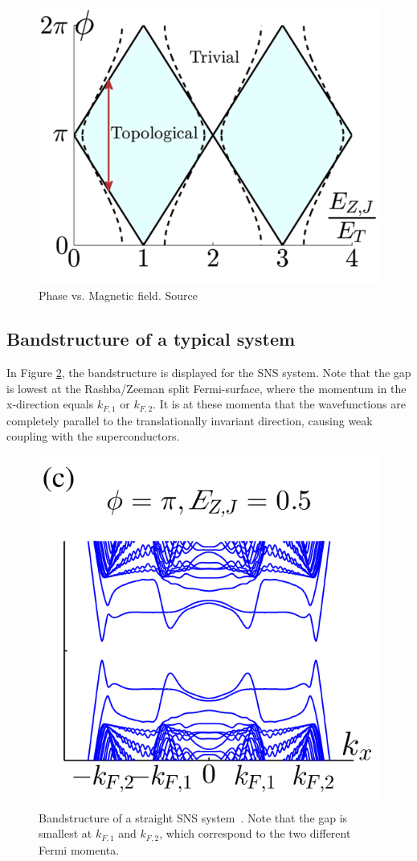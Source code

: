         \begin{figure}[!htb]
        \centering
        \includegraphics[width=0.5\columnwidth]{figures/pientka_phase_diagram}
        \caption{Phase vs. Magnetic field. Source\cite{pientka_topological_2017}}
        \label{fig:pientka_phase_diagram}
        \end{figure}
            
    \subsection{Bandstructure of a typical system}
        In Figure \ref{fig:pientka_bandstructure}, the bandstructure is displayed for the SNS system.
        Note that the gap is lowest at the Rashba/Zeeman split Fermi-surface, where the momentum in the x-direction equals $k_{F,1}$ or $k_{F,2}$.
        It is at these momenta that the wavefunctions are completely parallel to the translationally invariant direction, causing weak coupling with the superconductors.

        \begin{figure}[!htb]
        \centering
        \includegraphics[width=0.5\columnwidth]{figures/pientka_bandstructure}
        \caption{Bandstructure of a straight SNS system~\cite{pientka_topological_2017}.
        Note that the gap is smallest at $k_{F,1}$ and $k_{F,2}$, which correspond to the two different Fermi momenta.}
        \label{fig:pientka_bandstructure}
        \end{figure}